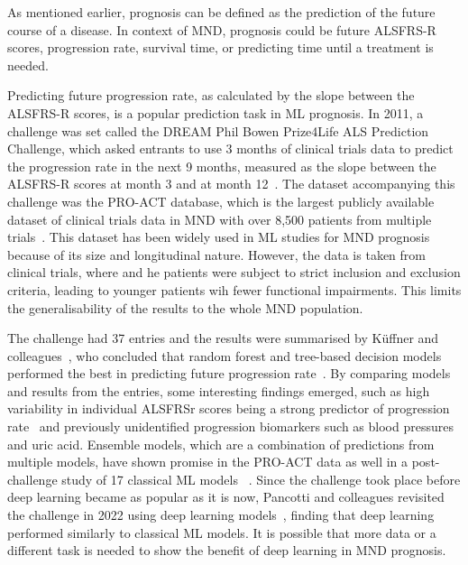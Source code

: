 As mentioned earlier, prognosis can be defined as the prediction of the future course of a disease.
In context of MND, prognosis could be future ALSFRS-R scores, progression rate, survival time, or predicting time until a treatment is needed.

Predicting future progression rate, as calculated by the slope between the ALSFRS-R scores, is a popular prediction task in ML prognosis.
In 2011, a challenge was set called the DREAM Phil Bowen Prize4Life ALS Prediction Challenge, which asked entrants to use 3 months of clinical trials data to predict the progression rate in the next 9 months, measured as the slope between the ALSFRS-R scores at month 3 and at month 12~\cite{kuffnerCrowdsourcedAnalysisClinical2015}.
The dataset accompanying this challenge was the PRO-ACT database, which is the largest publicly available dataset of clinical trials data in MND with over 8,500 patients from multiple trials~\cite{atassiPROACTDatabaseDesign2014}.
This dataset has been widely used in ML studies for MND prognosis because of its size and longitudinal nature.
However, the data is taken from clinical trials, where and he patients were subject to strict inclusion and exclusion criteria, leading to younger patients wih fewer functional impairments.
This limits the generalisability of the results to the whole MND population.

The challenge had 37 entries and the results were summarised by Küffner and colleagues~\cite{kuffnerCrowdsourcedAnalysisClinical2015}, who concluded that random forest and tree-based decision models performed the best in predicting future progression rate~\cite{hothornRandomForest4LifeRandomForest2014}.
By comparing models and results from the entries, some interesting findings emerged, such as high variability in individual ALSFRSr scores being a strong predictor of progression rate~\cite{hothornRandomForest4LifeRandomForest2014} and previously unidentified progression biomarkers such as blood pressures and uric acid.
Ensemble models, which are a combination of predictions from multiple models, have shown promise in the PRO-ACT data as well in a post-challenge study of 17 classical ML models ~\cite{turabiehMachineLearningEmpowered2024}.
Since the challenge took place before deep learning became as popular as it is now, Pancotti and colleagues revisited the challenge in 2022 using deep learning models~\cite{pancottiDeepLearningMethods2022}, finding that deep learning performed similarly to classical ML models.
It is possible that more data or a different task is needed to show the benefit of deep learning in MND prognosis.

